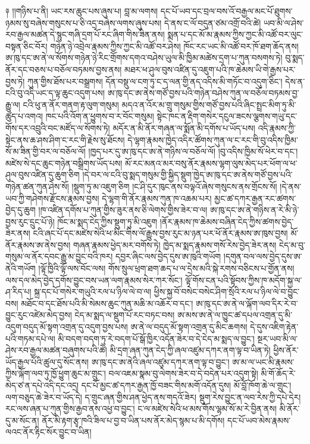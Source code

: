 \documentclass{article}
\begin{document}
༈ །།གཉིས་པ་ནི། ཡང་རས་ཆུང་པས་ཞུས་པ། བླ་མ་ལགས། དང་པོ་ཡབ་དང་བྲལ་བས་འོ་བརྒྱལ་མང་པོ་ཐུགས་ཉམས་སུ་བཞེས་གསུངས་པ་ཅི་འདྲ་བཞེས་ལགས་ཞུས་པས། དེ་ནས་ང་ལོ་བདུན་ཙམ་འགྲོ་བའི་ཚེ། ཡབ་མི་ལ་ཤེས་རབ་རྒྱལ་མཚན་དེ་སྙུང་གཞི་དྲག་པོ་རང་ཞིག་གིས་ཟིན་ནས། སྨན་པ་དང་མོ་མ་རྣམས་ཀྱིས་ཀྱང་མི་འཚོ་བར་ལུང་བསྟན་ཅིང་བོར། གཉེན་ཉེ་འབྲེལ་རྣམས་ཀྱིས་ཀྱང་མི་འཚོ་བར་ཤེས། ཁོང་རང་ཡང་མི་འཚོ་བར་ཁོ་ཐག་ཆོད་ནས། ཨ་ཁུ་དང་ཨ་ནེ་ལ་སོགས་གཉེན་ཉེ་རིང་གྲོགས་དགའ་བཤེས་ཡུལ་མི་ཁྱིམ་མཚེས་དྲག་པ་ཀུན་བསགས་ཏེ། བུ་སྨད་ནོར་དང་བཅས་པ་བཅོལ་བཏམས་བྱས་ནས། མཐར་ཕ་ཤུལ་བུས་འཛིན་དུ་འཇུག་པའི་ཁ་ཆེམས་ཡི་གེ་རྒྱས་པར་བྱས་ཏེ། ཀུན་གྱིས་ཐོས་པར་བསྒྲགས། དོན་བསྡུ་ལ་ངག་ཏུ་ང་ད་ལན་གྱི་ནད་འདིས་མི་གཏོང་བ་འདུག་ཅིང་། དེས་ན་ངའི་བུ་འདི་ཡང་ད་ལྟ་ཆུང་འདུག་པས། ཨ་ཁུ་དང་ཨ་ནེས་གཙོ་བྱས་པའི་གཉེན་བཤེས་ཀུན་ལ་བཅོལ་བཏམས་བྱ་རྒྱུ་ལ། ངའི་ཕུ་ན་ནོར་གནག་རྟ་ལུག་གསུམ། མདའ་ན་འོར་མ་གྲུ་གསུམ་གྱིས་གཙོ་བྱས་པའི་ཞིང་སྤྲང་མིག་ཏུ་མི་ཚུད་པ་འགའ། ཁང་པའི་འོག་ན་ཕྱུགས་བ་ར་བོང་གསུམ། སྟེང་ཁང་ན་རྡིག་གསེར་དངུལ་ཟངས་ལྕགས་གཡུ་དང་གོས་དར་འབྲུའི་བང་མཛོད་ལ་སོགས་ཏེ། མདོར་ན་མི་ནོར་གཞན་ལ་སྨོན་མི་དགོས་པ་ཡོད་པས། འདི་རྣམས་ཀྱི་སྟེང་ནས་ཆ་ཤས་ཤིག་ང་རང་གི་རྗེས་སུ་ཐོངས། དེ་ལྷག་རྣམས་ཁྱེད་འདིར་ཚོགས་ཀུན་ལ་ང་རང་གི་བུ་འདིས་ཁྱིམ་སོ་མ་ཟིན་གྱི་བར་ལ་བཅོལ་ལོ། །ཁྱད་པར་དུ་ཨ་ཁུ་དང་ཨ་ནེ་གཉིས་ལ་བཅོལ་ལོ། །བུ་འདིས་ཁྱིམ་སོ་ཕེར་བ་དང་། མཛེས་སེ་དང་ཆུང་གཉེན་བསྒྲིགས་ཡོད་པས། མོ་རང་མནའ་མར་བསུ་ནོར་རྣམས་ལྷག་ལུས་མེད་པར་ཕོག་ལ་ཕ་ཤུལ་བུས་འཛིན་དུ་ཆུག་ཅིག །དེ་བར་ལ་ངའི་བུ་སྨད་གསུམ་གྱི་སྐྱིད་སྡུག་ཁྱེད་ཨ་ཁུ་དང་ཨ་ནེས་གཙོ་བྱས་པའི་གཉེན་ཚན་ཀུན་ཤེས་སོ། །སྡུག་ཏུ་མ་འཇུག་ཅིག །ང་ཤི་དུར་ཁུང་ནས་བལྟའོ་ཞེས་གསུངས་ནས་གྲོངས་སོ། །དེ་ནས་ཡབ་ཀྱི་གཤེགས་རྫོངས་རྣམས་བྱས། དེ་ལྷག་གི་ནོར་རྣམས་ཀུན་ཁ་འཆམ་པར། མྱང་ཚ་དཀར་རྒྱན་རང་ཚགས་བྱེད་དུ་ཆུག །ཁ་འཛིན་དགོས་པ་ཀུན་གྱིས་ཟུར་ནས་ཅི་ལེགས་གྱིས་ཟེར་བ་ལ། ཨ་ཁུ་དང་ཨ་ནེ་གཉིས་ན་རེ་མི་ཉེ་བྱས་རུང་དྲུང་པོ་ཉེ། ཁོང་མ་སྨད་ངེད་ཀྱིས་སྡུག་ཏུ་མི་འཇུག །ནོར་རྣམས་ཁ་ཆེམས་བཞིན་ངེད་ཀྱིས་ཚགས་བྱེད་ཟེར་ནས། ངའི་ཞང་པོ་དང་མཛེས་སེའི་ཕ་མིང་གིས་ལོ་རྒྱུས་བྱས་རུང་མ་ཉན་པར་ཕོ་ནོར་རྣམས་ཨ་ཁུས་བྱས། མོ་ནོར་རྣམས་ཨ་ནེས་བྱས། གཞན་རྣམས་ཕྱེད་མར་བགོས་ཏེ། ཁྱེད་མ་སྨད་རྣམས་གསོ་རེས་བྱེད་ཟེར་ནས། ངེད་མ་བུ་གསུམ་ལ་ནོར་དབང་རྒྱུ་མ་བྱུང་བའི་ཁར། དབྱར་ཞིང་ལས་བྱེད་དུས་ཨ་ཁུའི་གཡོག །དགུན་བལ་ལས་བྱེད་དུས་ཨ་ནེའི་གཡོག །ལྟོ་ཁྱིའི་ལྟོ་ལས་བོང་ལས། གོས་སྲུལ་ཕྲག་ཐག་ཆད་པ་ལ་དྲེས་མའི་སྐེ་རགས་བཅིངས་པ་གྱོན་ནས། ལས་དལ་མེད་བྱེད་དགོས་བྱུང་བས་ཡན་ལག་རྣམས་སེར་ཀར་སོང་། ལྟོ་གོས་ངན་པའི་སྟོབས་ཀྱིས་ཁ་མདོག་སྐྱ་ལ་ཤ་རིད་པ། སྐྲ་དང་པོ་གསེར་གཡུའི་རལ་པ་ཉིལ་ལེ་བ་ལ། ཕྱིས་སྐྱ་བོ་བསེང་བསེང་ཤིག་སྲོའི་རལ་པ་ཉིལ་ལེ་བ་བྱུང་བས། མཐོང་བ་དང་ཐོས་པའི་མི་སེམས་ཆུང་ཀུན་མཆི་མ་འཆོར་བ་དང་། ཨ་ཁུ་དང་ཨ་ནེ་ལ་ལྐོག་ལབ་དིར་རེ་བ་བྱུང་རུང་འཛེམ་མེད་བྱས། ངེད་མ་སྨད་ལ་སྡུག་པོ་རང་བཏང་བས། ཨ་མས་ཨ་ནེ་ལ་ཁྱུང་ཚ་དཔལ་འགྲན་དུ་མི་འདུག་བདུད་མོ་སྟག་འགྲན་དུ་འདུག་བྱས་པས། ཨ་ནེ་ལ་བདུད་མོ་སྟག་འགྲན་དུ་མིང་ཆགས། དེ་དུས་འཇིག་རྟེན་པའི་གཏམ་དཔེ་ལ། མི་བདག་བདག་ཏུ་རེ་བདག་པོ་སྒོ་ཁྱིར་འདོན་ཟེར་བ་དེ་ངེད་མ་སྨད་ལ་བྱུང་། སྔར་ཡབ་མི་ལ་ཤེས་རབ་རྒྱལ་མཚན་བཞུགས་པའི་ཚེ། མི་དྲག་ཞན་ཀུན་ངེད་ཀྱི་ཞལ་འཛུམ་དཀར་ནག་ལྟ་བ་ཡིན་ཏེ། ཕྱིས་ནོར་ཡོད་རྒྱལ་པོའི་ཚུལ་དུ་སོང་ནས། ཨ་ཁུ་དང་ཨ་ནེའི་ཞལ་འཛུམ་དཀར་ནག་ལྟ་བ་བྱུང་། ཨ་མ་ལ་ཡང་མི་རྣམས་ཀྱིས་ལྐོག་ལབ་ཏུ་ཁྱོ་ཕྱུག་ཆུང་མ་གྲུང་། བལ་འཇམ་སྣམ་བུ་ལེགས་ཟེར་བ་དེ་བདེན་པར་འདུག་སྟེ། མི་གོ་ཆོད་རེ་མེད་ཙ་ན་དཔེ་འདི་དང་འདྲ། དང་པོ་མྱང་ཚ་དཀར་རྒྱན་ཁྱོ་བཟང་གིས་མགོ་འདོན་དུས། མོ་བློ་ཁོག་ཆེ་ལ་གྲུང་། ལག་བཅུད་ཆེ་ཟེར་བ་ཡོད་དེ། ད་གྲུང་ཞན་གྱིས་ཤན་ཕྱེད་ནས་གདའོ་ཟེར། སྡུག་རེས་བྱུང་ན་ལབ་རེས་ཀྱི་དཔེ་དེར། རང་ལས་ཞན་པ་ཀུན་གྱིས་རྒྱབ་ནས་འཕྱ་བ་བྱུང་། ང་ལ་མཛེས་སེའི་ཕ་མས་གོས་ལྷམ་སོ་མ་རེ་བྱིན་ནས། མི་ནོར་དུ་མ་སོང་ན། ནོར་མི་རྟག་རྩྭ་ཁའི་ཟིལ་པ་བྱ་བ་ཡིན་པས་ནོར་མེད་སྙམ་པ་མི་དགོས། དང་པོ་ཡབ་མེས་རྣམས་ལའང་ནོར་རྟིང་སོར་བྱུང་བ་ཡིན། 
\end{document}
